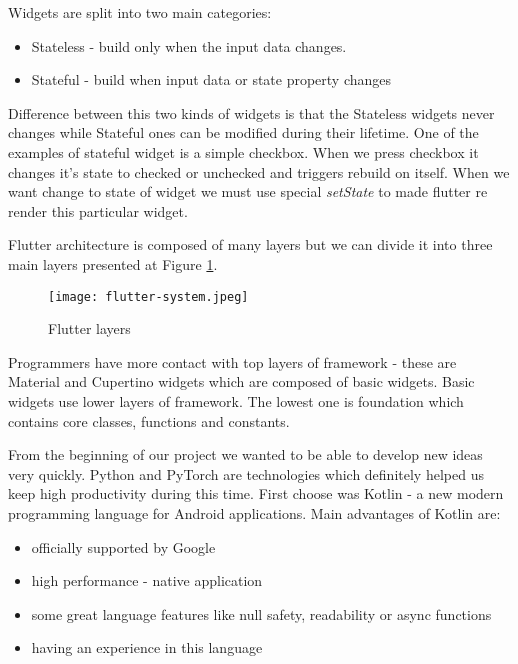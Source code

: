 \documentclass[../Main.tex]{subfiles}
\begin{document}
        
        Widgets are split into two main categories:
        \begin{itemize}
             \item Stateless - build only when the input data changes. 
             \item Stateful - build when input data or state property changes 
        \end{itemize}
        Difference between this two kinds of widgets is that the Stateless widgets
        never changes while Stateful ones can be modified during their lifetime.
        One of the examples of stateful widget is a simple checkbox. When we press checkbox
        it changes it's state to checked or unchecked and triggers rebuild on itself.
        When we want change to state of widget we must use special 
        \textit{setState} to made flutter re render this particular widget.
    
        
        Flutter architecture is composed of many layers but we can divide it into 
        three main layers presented at Figure \ref{fig:flutter-layers}.
        \begin{figure}[h]
            \centering
            \texttt{[image: flutter-system.jpeg]}
            \caption{Flutter layers}
            \label{fig:flutter-layers}
        \end{figure}
        Programmers have more contact with top layers of framework - 
        these are Material and Cupertino widgets which are composed of basic widgets.
        Basic widgets use lower layers of framework. 
        The lowest one is foundation which contains core classes, functions and constants.
    
    
        From the beginning of our project we wanted to be able to develop new ideas
        very quickly.
        Python and PyTorch are technologies which definitely helped us keep high
        productivity during this time. First choose was Kotlin - a new modern programming 
        language for Android applications. Main advantages of Kotlin are:
            \begin{itemize}
                \item officially supported by Google
                \item high performance - native application
                \item some great language features like null safety, readability or async functions
                \item having an experience in this language
            \end{itemize}
            
\end{document}
